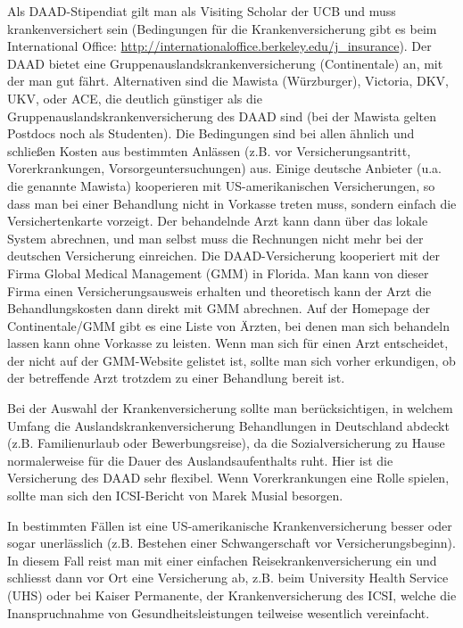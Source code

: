 \documentclass[a4paper]{scrreprt}
\begin{document}
Als DAAD-Stipendiat gilt man als Visiting Scholar der UCB und muss krankenversichert sein (Bedingungen für die Krankenversicherung gibt es beim International Office:  \url{http://internationaloffice.berkeley.edu/j\_insurance}). Der DAAD bietet eine Gruppenauslandskrankenversicherung (Continentale) an, mit der man gut fährt. Alternativen sind die Mawista (Würzburger), Victoria, DKV, UKV, oder ACE, die deutlich günstiger als die Gruppenauslandskrankenversicherung des DAAD sind (bei der Mawista gelten Postdocs noch als Studenten). Die Bedingungen sind bei allen ähnlich und schließen Kosten aus bestimmten Anlässen (z.B. vor Versicherungsantritt, Vorerkrankungen, Vorsorgeuntersuchungen) aus. Einige deutsche Anbieter (u.a. die genannte Mawista) kooperieren mit US-amerikanischen Versicherungen, so dass man bei einer Behandlung nicht in Vorkasse treten muss, sondern einfach die Versichertenkarte vorzeigt. Der behandelnde Arzt kann dann über das lokale System abrechnen, und man selbst muss die Rechnungen nicht mehr bei der deutschen Versicherung einreichen. Die DAAD-Versicherung kooperiert mit der Firma Global Medical Management (GMM) in Florida. Man kann von dieser Firma einen Versicherungsausweis erhalten und theoretisch kann der Arzt die Behandlungskosten dann direkt mit GMM abrechnen. Auf der Homepage der Continentale/GMM gibt es eine Liste von Ärzten, bei denen man sich behandeln lassen kann ohne Vorkasse zu leisten.
Wenn man sich für einen Arzt entscheidet, der nicht auf der GMM-Website gelistet ist, sollte man sich vorher erkundigen, ob der betreffende Arzt trotzdem zu einer Behandlung bereit ist.

Bei der Auswahl der Krankenversicherung sollte man berücksichtigen, in welchem Umfang die Auslandskrankenversicherung Behandlungen in Deutschland abdeckt (z.B. Familienurlaub oder Bewerbungsreise), da die Sozialversicherung zu Hause normalerweise für die Dauer des Auslandsaufenthalts ruht. Hier ist die Versicherung des DAAD sehr flexibel. Wenn Vorerkrankungen eine Rolle spielen, sollte man sich den ICSI-Bericht von Marek Musial besorgen.

In bestimmten Fällen ist eine US-amerikanische Krankenversicherung besser oder sogar unerlässlich (z.B. Bestehen einer Schwangerschaft vor Versicherungsbeginn). In diesem Fall reist man mit einer einfachen Reisekrankenversicherung ein und schliesst dann vor Ort eine Versicherung ab, z.B. beim University Health Service (UHS) oder bei Kaiser Permanente, der Krankenversicherung des ICSI, welche die Inanspruchnahme von Gesundheitsleistungen teilweise wesentlich vereinfacht.
\end{document}

